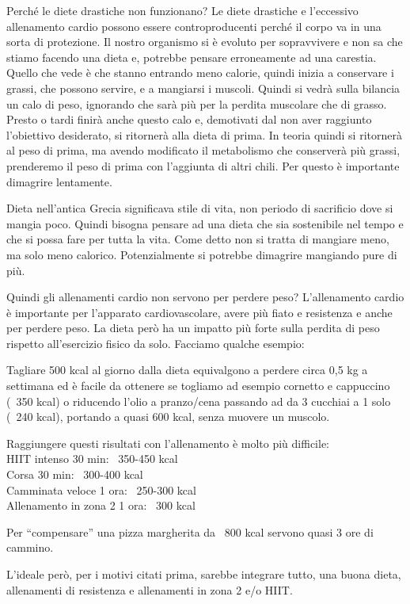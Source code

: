 \documentclass[12pt]{book} %
\begin{document}
Perché le diete drastiche non funzionano?
Le diete drastiche e l'eccessivo allenamento cardio possono essere controproducenti perché il corpo va in una sorta di protezione. Il nostro organismo si è evoluto per sopravvivere e non sa che stiamo facendo una dieta e, potrebbe pensare erroneamente ad una carestia. Quello che vede è che stanno entrando meno calorie, quindi inizia a conservare i grassi, che possono servire, e a mangiarsi i muscoli. Quindi si vedrà sulla bilancia un calo di peso, ignorando che sarà più per la perdita muscolare che di grasso. Presto o tardi finirà anche questo calo e, demotivati dal non aver raggiunto l'obiettivo desiderato, si ritornerà alla dieta di prima. In teoria quindi si ritornerà al peso di prima, ma avendo modificato il metabolismo che conserverà più grassi, prenderemo il peso di prima con l'aggiunta di altri chili.
Per questo è importante dimagrire lentamente.

Dieta nell'antica Grecia significava stile di vita, non periodo di sacrificio dove si mangia poco. Quindi bisogna pensare ad una dieta che sia sostenibile nel tempo e che si possa fare per tutta la vita. Come detto non si tratta di mangiare meno, ma solo meno calorico. Potenzialmente si potrebbe dimagrire mangiando pure di più.

Quindi gli allenamenti cardio non servono per perdere peso?
L'allenamento cardio è importante per l'apparato cardiovascolare, avere più fiato e resistenza e anche per perdere peso. La dieta però ha un impatto più forte sulla perdita di peso rispetto all’esercizio fisico da solo. Facciamo qualche esempio:

Tagliare 500 kcal al giorno dalla dieta equivalgono a perdere circa 0,5 kg a settimana ed è facile da ottenere se togliamo ad esempio cornetto e cappuccino (~350 kcal) o riducendo l'olio a pranzo/cena passando ad da 3 cucchiai a 1 solo (~240 kcal), portando a quasi 600 kcal, senza muovere un muscolo.

Raggiungere questi risultati con l'allenamento è molto più difficile:\\
HIIT intenso 30 min: ~350-450 kcal\\
Corsa 30 min: ~300-400 kcal\\
Camminata veloce 1 ora: ~250-300 kcal\\
Allenamento in zona 2 1 ora: ~300 kcal

Per “compensare” una pizza margherita da ~800 kcal servono quasi 3 ore di cammino.

L'ideale però, per i motivi citati prima, sarebbe integrare tutto, una buona dieta, allenamenti di resistenza e allenamenti in zona 2 e/o HIIT.
\end{document}
